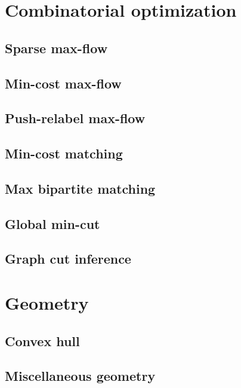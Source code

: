\section{Combinatorial optimization}
\subsection{Sparse max-flow}
\raggedbottom
\hrulefill
\subsection{Min-cost max-flow}
\raggedbottom
\hrulefill
\subsection{Push-relabel max-flow}
\raggedbottom
\hrulefill
\subsection{Min-cost matching}
\raggedbottom
\hrulefill
\subsection{Max bipartite matching}
\raggedbottom
\hrulefill
\subsection{Global min-cut}
\raggedbottom
\hrulefill
\subsection{Graph cut inference}
\raggedbottom

\section{Geometry}
\subsection{Convex hull}
\raggedbottom
\hrulefill
\subsection{Miscellaneous geometry}
\raggedbottom
\hrulefill
